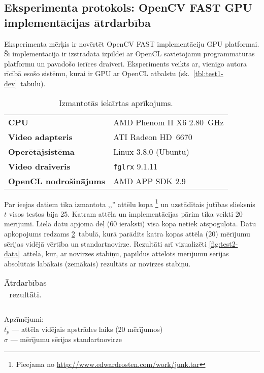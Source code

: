 \subsection{Eksperimenta protokols: OpenCV FAST GPU implementācijas ātrdarbība}\label{appx:test2}
\setcounter{table}{0} %
\setcounter{figure}{0} %
Eksperimenta mērķis ir novērtēt OpenCV FAST implementāciju GPU platformai.
Šī implementācija ir izstrādāta izpildei ar OpenCL savietojamu 
programmatūras platformu un pavadošo ierīces draiveri. Eksperiments veikts
ar, vienīgo autora rīcībā esošo sistēmu, kurai ir GPU ar OpenCL atbalstu
(sk.~\ref{tbl:test1-dev}~tabulu).
\begin{table}[hb]\small
	\centering
	\caption{Izmantotās iekārtas aprīkojums.}
	\label{tbl:test2-dev}
	\vspace{4pt}
	\begin{tabular}{ll}
		\toprule
		\textbf{CPU} & AMD Phenom II X6 2.80~GHz\\
		\textbf{Video adapteris} & ATI Radeon HD~6670 \\
		\midrule
		\textbf{Operētājsistēma} & Linux 3.8.0 (Ubuntu)\\
		\textbf{Video draiveris} & \texttt{fglrx} 9.1.11\\
		\textbf{OpenCL nodrošinājums} & AMD APP SDK 2.9\\
		\bottomrule
	\end{tabular}
\end{table}

Par ieejas datiem tika izmantota ,,'' attēlu kopa%
	\footnote{Pieejama no \url{http://www.edwardrosten.com/work/junk.tar}}
un uzstādītais jutības slieksnis $t$ visos testos bija 25.
Katram attēla un implementācijas pārim tika veikti 20 mērījumi.
Lielā datu apjoma dēļ (60 ieraksti) visa kopa netiek atspoguļota. Datu
apkopojums redzams \ref{tbl:test2-data}~tabulā, kurā parādīts katra kopas
attēla (20) mērījumu sērijas vidējā vērtība un standartnovirze.
Rezultāti arī vizualizēti \ref{fig:test2-data}~attēlā, kur,
ar novirzes stabiņu, papildus attēlots
mērījumu sērijas absolūtais labākais (zemākais) rezultāts ar novirzes stabiņu.
\begin{table}[hb]\footnotesize
	\centering
	\caption{Ātrdarbības rezultāti.}
	\label{tbl:test2-data}
	\vspace{4pt}
	\begin{tabular}{c*{6}{r}}
		\toprule
		
		\bottomrule
	\end{tabular}
	\begin{minipage}{0.5\linewidth}
		\noindent Apzīmējumi:\\
		$\bar{t_p}$ --- attēla vidējais apstrādes laiks (20 mērījumos)\\
		$\sigma$ --- mērījumu sērijas standartnovirze
	\end{minipage}
\end{table}

